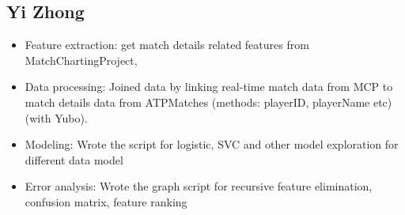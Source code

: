 \documentclass[paper=a4, fontsize=10pt]{scrartcl} %
\numberwithin{equation}{section} %
\numberwithin{figure}{section} %
\numberwithin{table}{section} %
\begin{document}
\subsection{Yi Zhong}
\begin{itemize}
\item Feature extraction: get match details related features from MatchChartingProject, 
\item Data processing: Joined data by linking real-time match data from MCP \cite{tennis_charting} to match details data from ATPMatches \cite{tennis_atp} (methods: playerID, playerName etc) (with Yubo).
\item Modeling: Wrote the script for logistic, SVC and other model exploration for different data model
\item Error analysis: Wrote the graph script for recursive feature elimination, confusion matrix, feature ranking
\end{itemize}


 
\end{document}
